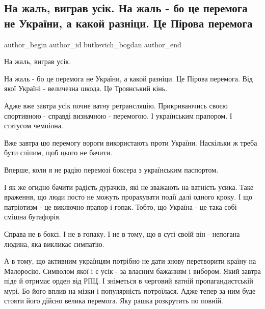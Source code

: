  
 
 
 
 
 
\subsection{На жаль, виграв усік. На жаль - бо це перемога не України, а какой разніци. Це Пірова перемога}
\label{sec:26_09_2021.fb.butkevich_bogdan.1.usik_pirrova_pobeda}
 
\ifcmt
 author_begin
   author_id butkevich_bogdan
 author_end
\fi

На жаль, виграв усік.

На жаль - бо це перемога не України, а какой разніци. Це Пірова перемога. Від
якої Україні - величезна шкода. Це Троянський кінь.

Адже вже завтра усік почне ватну ретрансляцію. Прикриваючись своєю спортивною -
справді визначною - перемогою. І українським прапором. І статусом чемпіона.

Вже завтра цю перемогу вороги використають проти України. Наскільки ж треба
бути сліпим, щоб цього не бачити.

Вперше, коли я не радію перемозі боксера з українським паспортом.

І як же огидно бачити радість дурачків, які не зважають на ватність усика. Таке
враження, що люди посто не можуть прорахувати події далі одного кроку. І що
патріотизм - це виключно прапор і гопак. Тобто, що Україна - це така собі
смішна бутафорія.

Справа не в боксі. І не в гопаку. І не в тому, що в суті своїй він - непогана
людина, яка викликає симпатію.

А в тому, що активним українцям потрібно не дати знову перетворити країну на
Малоросію. Символом якої і є усік - за власним бажанням і вибором. Який завтра
піде й отримає орден від РПЦ. І зніметься в черговий ватній пропагандистській
мурі. Бо його вплив на мізки і популярність потроїлася. Адже тепер за ним буде
стояти його дійсно велика перемога. Яку рашка розкрутить по повній.

